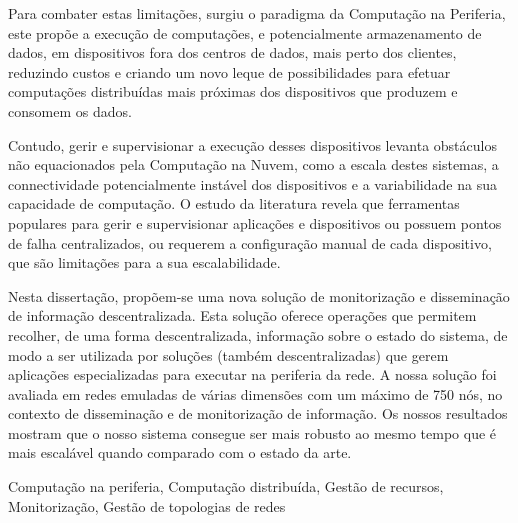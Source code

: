 Para combater estas limitações, surgiu o paradigma da Computação na Periferia, este propõe a execução de computações, e potencialmente armazenamento de dados, em dispositivos fora dos centros de dados, mais perto dos clientes, reduzindo custos e criando um novo leque de possibilidades para efetuar computações distribuídas mais próximas dos dispositivos que produzem e consomem os dados.

Contudo, gerir e supervisionar a execução desses dispositivos levanta obstáculos não equacionados pela Computação na Nuvem, como a escala destes sistemas, a connectividade potencialmente instável dos dispositivos e a variabilidade na sua capacidade de computação. O estudo da literatura revela que ferramentas populares para gerir e supervisionar aplicações e dispositivos ou possuem pontos de falha centralizados, ou requerem a configuração manual de cada dispositivo, que são limitações para a sua escalabilidade.

Nesta dissertação, propõem-se uma nova solução de monitorização e disseminação de informação descentralizada. Esta solução oferece operações que permitem recolher, de uma forma descentralizada, informação sobre o estado do sistema, de modo a ser utilizada por soluções (também descentralizadas) que gerem aplicações especializadas para executar na periferia da rede. A nossa solução foi avaliada em redes emuladas de várias dimensões com um máximo de 750 nós, no contexto de disseminação e de monitorização de informação. Os nossos resultados mostram que o nosso sistema consegue ser mais robusto ao mesmo tempo que é mais escalável quando comparado com o estado da arte.

\begin{keywords}
    Computação na periferia, Computação distribuída, Gestão de recursos, Monitorização, Gestão de topologias de redes
\end{keywords}





